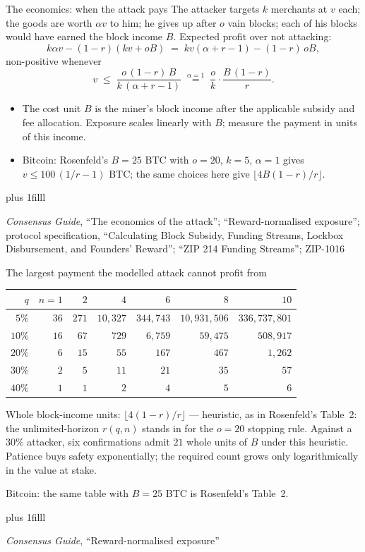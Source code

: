 \documentclass[aspectratio=169,11pt]{beamer}
\newcommand{\src}[1]{\par\vskip0pt plus 1filll
  {\fontsize{6}{7.2}\selectfont\color{arbdim}\raggedright #1\par}}
\begin{document}
\begin{frame}{The economics: when the attack pays}
The attacker targets $k$ merchants at $v$ each; the goods are worth
$\alpha v$ to him; he gives up after $o$ vain blocks; each of his
blocks would have earned the block income $B$. Expected profit over not
attacking:
\[
  k\alpha v - (1 - r)(kv + oB)
  \;=\; kv(\alpha + r - 1) - (1 - r)\,oB ,
\]
non-positive whenever
\[
  v \;\leq\; \frac{o\,(1 - r)\,B}{k\,(\alpha + r - 1)}
  \;\overset{\alpha = 1}{=}\;
  \frac{o}{k} \cdot \frac{B\,(1 - r)}{r} .
\]
\begin{itemize}
\item The cost unit $B$ is the miner's block income after the
  applicable subsidy and fee allocation. Exposure scales linearly
  with $B$; measure the payment in units of this income.
\item \alert{Bitcoin:} Rosenfeld's $B = 25$ BTC with $o = 20$, $k = 5$,
  $\alpha = 1$ gives $v \leq 100\,(1/r - 1)$ BTC; the same choices here
  give $\lfloor 4B(1 - r)/r \rfloor$.
\end{itemize}
\src{\emph{Consensus Guide}, ``The economics of the attack'';
  ``Reward-normalised exposure''; protocol specification, ``Calculating Block
  Subsidy, Funding Streams, Lockbox Disbursement, and Founders'
  Reward''; ``ZIP 214 Funding Streams''; ZIP-1016}
\end{frame}

\begin{frame}{The largest payment the modelled attack cannot profit from}
\begin{center}
\small
\begin{tabular}{@{}r rrrrrr@{}}
\toprule
$q$ & $n{=}1$ & $2$ & $4$ & $6$ & $8$ & $10$ \\
\midrule
$5\%$ & $36$ & $271$ & $10{,}327$ & $344{,}743$ & $10{,}931{,}506$ &
  $336{,}737{,}801$ \\
$10\%$ & $16$ & $67$ & $729$ & $6{,}759$ & $59{,}475$ & $508{,}917$ \\
$20\%$ & $6$ & $15$ & $55$ & $167$ & $467$ & $1{,}262$ \\
$30\%$ & $2$ & $5$ & $11$ & $21$ & $35$ & $57$ \\
$40\%$ & $1$ & $1$ & $2$ & $4$ & $5$ & $6$ \\
\bottomrule
\end{tabular}
\end{center}
Whole block-income units: $\lfloor 4(1 - r)/r \rfloor$ ---
heuristic, as in Rosenfeld's Table~2: the unlimited-horizon $r(q, n)$
stands in for the $o = 20$ stopping rule. Against a $30\%$ attacker,
six confirmations admit $21$ whole units of $B$ under this heuristic.
Patience buys safety exponentially; the required count grows only
logarithmically in the value at stake.
\medskip

\alert{Bitcoin:} the same table with $B = 25$ BTC is Rosenfeld's
Table~2.
\src{\emph{Consensus Guide}, ``Reward-normalised exposure''}
\end{frame}
\end{document}
